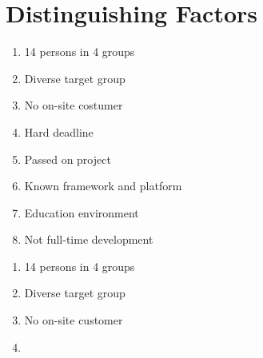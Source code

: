 \documentclass{article}
\begin{document}
\section{Distinguishing Factors}


\begin{enumerate}
\item 14 persons in 4 groups
\item Diverse target group
\item No on-site costumer
\item Hard deadline
\item Passed on project
\item Known framework and platform
\item Education environment
\item Not full-time development
\end{enumerate}

\begin{enumerate}
	\item 14 persons in 4 groups
	\item Diverse target group
	\item No on-site customer
	\item 
\end{enumerate}
\end{document}
